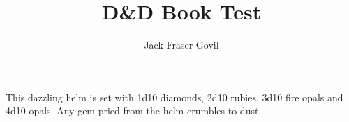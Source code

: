 \documentclass[size=10pt]{rpgbook}
\title{D\&D Book Test}
\author{Jack Fraser-Govil}
\begin{document}
    \maketitle

    This dazzling helm is set with 1d10 diamonds, 2d10 rubies, 3d10 fire opals and 4d10 opals. Any gem pried from the helm crumbles to dust.

	\Blindtext
\end{document}
